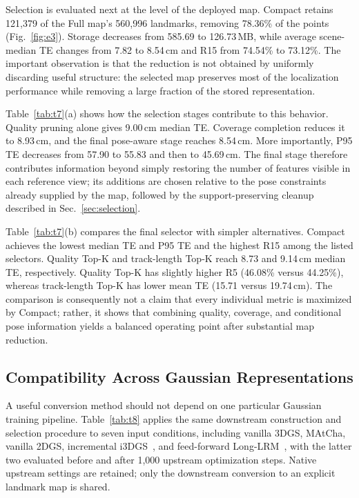 Selection is evaluated next at the level of the deployed map. Compact retains 121,379 of the Full map's 560,996 landmarks, removing 78.36\% of the points (Fig.~\ref{fig:e3}). Storage decreases from 585.69 to 126.73\,MB, while average scene-median TE changes from 7.82 to 8.54\,cm and R15 from 74.54\% to 73.12\%. The important observation is that the reduction is not obtained by uniformly discarding useful structure: the selected map preserves most of the localization performance while removing a large fraction of the stored representation.

Table~\ref{tab:t7}(a) shows how the selection stages contribute to this behavior. Quality pruning alone gives 9.00\,cm median TE. Coverage completion reduces it to 8.93\,cm, and the final pose-aware stage reaches 8.54\,cm. More importantly, P95 TE decreases from 57.90 to 55.83 and then to 45.69\,cm. The final stage therefore contributes information beyond simply restoring the number of features visible in each reference view; its additions are chosen relative to the pose constraints already supplied by the map, followed by the support-preserving cleanup described in Sec.~\ref{sec:selection}.

Table~\ref{tab:t7}(b) compares the final selector with simpler alternatives. Compact achieves the lowest median TE and P95 TE and the highest R15 among the listed selectors. Quality Top-K and track-length Top-K reach 8.73 and 9.14\,cm median TE, respectively. Quality Top-K has slightly higher R5 (46.08\% versus 44.25\%), whereas track-length Top-K has lower mean TE (15.71 versus 19.74\,cm). The comparison is consequently not a claim that every individual metric is maximized by Compact; rather, it shows that combining quality, coverage, and conditional pose information yields a balanced operating point after substantial map reduction.

\subsection{Compatibility Across Gaussian Representations}
\label{sec:priors}



A useful conversion method should not depend on one particular Gaussian training pipeline. Table~\ref{tab:t8} applies the same downstream construction and selection procedure to seven input conditions, including vanilla 3DGS, MAtCha, vanilla 2DGS, incremental i3DGS~\cite{meuleman2026i3dgs}, and feed-forward Long-LRM~\cite{chen2025longlrm}, with the latter two evaluated before and after 1,000 upstream optimization steps. Native upstream settings are retained; only the downstream conversion to an explicit landmark map is shared.

